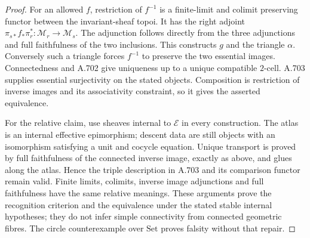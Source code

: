\begin{proof}
For an allowed $f$, restriction of $f^{-1}$ is a finite-limit and
colimit preserving functor between the invariant-sheaf topoi.
It has the right adjoint
$\pi_{s*}f_*\pi_r^*:\mathcal M_r\to\mathcal M_s$.
The adjunction follows directly from the three adjunctions and full
faithfulness of the two inclusions. This constructs $g$ and
the triangle $\alpha$. Conversely such a triangle forces $f^{-1}$
to preserve the two essential images. Connectedness and A.702 give
uniqueness up to a unique compatible $2$-cell. A.703 supplies essential
surjectivity on the stated objects. Composition is restriction of
inverse images and its associativity constraint, so it gives the
asserted equivalence.

For the relative claim, use sheaves internal to $\mathcal E$ in
every construction. The atlas is an internal effective epimorphism;
descent data are still objects with an isomorphism satisfying a unit
and cocycle equation. Unique transport is proved by full faithfulness
of the connected inverse image, exactly as above, and glues along
the atlas. Hence the triple description in A.703 and its comparison
functor remain valid. Finite limits, colimits, inverse image
adjunctions and full faithfulness have the same relative meanings.
These arguments prove the recognition criterion and the equivalence
under the stated stable internal hypotheses; they do not infer
simple connectivity from connected geometric fibres. The circle
counterexample over $\mathrm{Set}$ proves falsity without that repair.
\end{proof}
